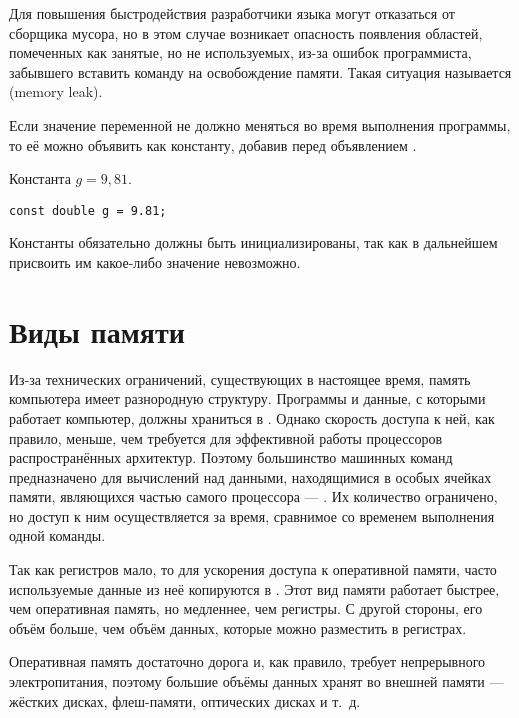 Для повышения быстродействия разработчики языка могут отказаться от
сборщика мусора, но в этом случае возникает опасность появления
областей, помеченных как занятые, но не используемых, из-за ошибок
программиста, забывшего вставить команду на освобождение памяти. Такая
ситуация называется  (memory
leak).



Если значение переменной не должно меняться во время выполнения
программы, то её можно объявить как константу, добавив перед
объявлением .

\begin{example}
Константа $g=9{,}81.$

\begin{lstlisting}
const double g = 9.81;
\end{lstlisting}
\end{example}

Константы обязательно должны быть инициализированы, так как в
дальнейшем присвоить им какое-либо значение невозможно.

\section{Виды памяти}


Из-за технических ограничений, существующих в настоящее время, память
компьютера имеет разнородную структуру. Программы и данные, с которыми
работает компьютер, должны храниться в
. Однако скорость доступа
к ней, как правило, меньше, чем требуется для эффективной работы
процессоров распространённых архитектур. Поэтому большинство машинных
команд предназначено для вычислений над данными, находящимися в особых
ячейках памяти, являющихся частью самого процессора — . Их количество ограничено, но доступ к ним
осуществляется за время, сравнимое со временем выполнения одной
команды.

Так как регистров мало, то для ускорения доступа к оперативной памяти,
часто используемые данные из неё копируются в .  Этот вид памяти работает быстрее, чем
оперативная память, но медленнее, чем регистры. С другой стороны, его
объём больше, чем объём данных, которые можно разместить в регистрах.

Оперативная память достаточно дорога и, как правило, требует
непрерывного электропитания, поэтому большие объёмы данных хранят во
внешней памяти — жёстких дисках, флеш-памяти, оптических дисках и
т.~д.

